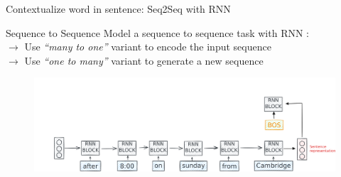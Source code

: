 \documentclass[10pt,aspectratio=169]{beamer}
\begin{document}
  \begin{frame}[noframenumbering]{Contextualize word in sentence: Seq2Seq with RNN}

    \begin{block}{Sequence to Sequence}
      \vspace{.1cm}
      {\footnotesize
        Model a sequence to sequence task with RNN :\\ 
        $\rightarrow $ Use \textit{``many to one''} variant to encode the input sequence\\
        $\rightarrow $ Use \textit{``one to many''} variant to generate a new sequence\\
      } 
    \end{block}

    \begin{figure}
      \centering
      \includegraphics[width=1.\textwidth]{img/RNN-example-seq2seq-7.pdf}
    \end{figure}


  \end{frame}
\end{document}
